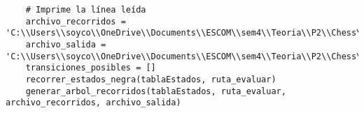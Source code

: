 \begin{lstlisting}
    # Imprime la línea leída
    archivo_recorridos = 'C:\\Users\\soyco\\OneDrive\\Documents\\ESCOM\\sem4\\Teoria\\P2\\Chess\\output\\recorridos_negra.txt'
    archivo_salida = 'C:\\Users\\soyco\\OneDrive\\Documents\\ESCOM\\sem4\\Teoria\\P2\\Chess\\output\\arbol_negra.dot'
    transiciones_posibles = []
    recorrer_estados_negra(tablaEstados, ruta_evaluar)
    generar_arbol_recorridos(tablaEstados, ruta_evaluar, archivo_recorridos, archivo_salida)
    

\end{lstlisting}